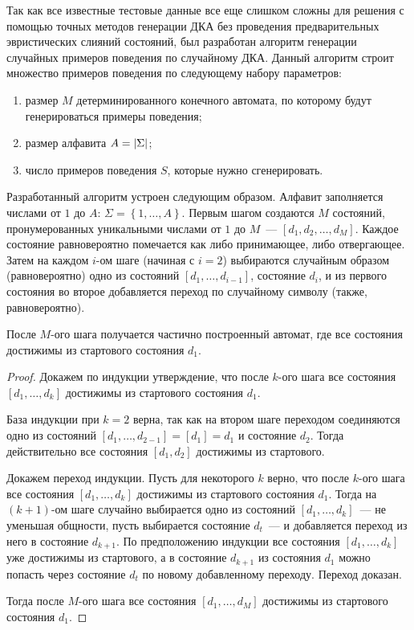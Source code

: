 Так как все известные тестовые данные все еще слишком сложны для решения с помощью точных методов генерации ДКА без проведения предварительных эвристических слияний состояний, был разработан алгоритм генерации случайных примеров поведения по случайному ДКА.
Данный алгоритм строит множество примеров поведения по следующему набору параметров:
\begin{enumerate}
  \item размер $M$ детерминированного конечного автомата, по которому будут генерироваться примеры поведения;
  \item размер алфавита $A=\lvert\Sigma\rvert$;
  \item число примеров поведения $S$, которые нужно сгенерировать.
\end{enumerate}
Разработанный алгоритм устроен следующим образом.
Алфавит заполняется числами от $1$ до $A$: $\Sigma=\left\{1,\ldots,A\right\}$.
Первым шагом создаются $M$ состояний, пронумерованных уникальными числами от $1$ до $M$~--- $\left[d_{1},d_{2},\ldots,d_{M}\right]$.
Каждое состояние равновероятно помечается как либо принимающее, либо отвергающее.
Затем на каждом $i$-ом шаге (начиная с $i = 2$) выбираются случайным образом (равновероятно) одно из состояний $\left[d_{1},\ldots,d_{i - 1}\right]$, состояние $d_{i}$, и из первого состояния во второе добавляется переход по случайному символу (также, равновероятно).

\begin{theorem}
  После $M$-ого шага получается частично построенный автомат, где все состояния достижимы из стартового состояния $d_{1}$.
  \begin{proof}
    Докажем по индукции утверждение, что после $k$-ого шага все состояния $\left[d_{1},\ldots,d_{k}\right]$ достижимы из стартового состояния $d_{1}$.
    
    База индукции при $k = 2$ верна, так как на втором шаге переходом соединяются одно из состояний $\left[d_{1},\ldots,d_{2-1}\right]=\left[d_{1}\right]=d_{1}$ и состояние $d_{2}$.
    Тогда действительно все состояния $\left[d_{1},d_{2}\right]$ достижимы из стартового.
    
    Докажем переход индукции.
    Пусть для некоторого $k$ верно, что после $k$-ого шага все состояния $\left[d_{1},\ldots,d_{k}\right]$ достижимы из стартового состояния $d_{1}$.
    Тогда на $(k+1)$-ом шаге случайно выбирается одно из состояний $\left[d_{1},\ldots,d_{k}\right]$~--- не уменьшая общности, пусть выбирается состояние $d_{t}$~--- и добавляется переход из него в состояние $d_{k + 1}$.
    По предположению индукции все состояния $\left[d_{1},\ldots,d_{k}\right]$ уже достижимы из стартового, а в состояние $d_{k + 1}$ из состояния $d_{1}$ можно попасть через состояние $d_{t}$ по новому добавленному переходу.
    Переход доказан.

    Тогда после $M$-ого шага все состояния $\left[d_{1},\ldots,d_{M}\right]$ достижимы из стартового состояния $d_{1}$.
  \end{proof}
\end{theorem}

